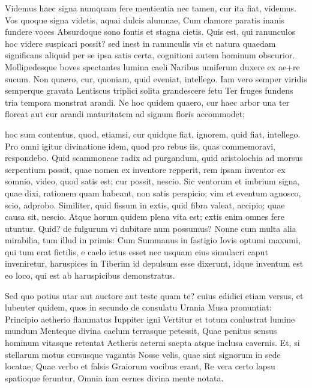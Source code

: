  Videmus haec signa numquam fere mentientia nec tamen, cur ita fiat, videmus. Vos quoque signa videtis, aquai dulcis alumnae, Cum clamore paratis inanis fundere voces Absurdoque sono fontis et stagna cietis. Quis est, qui ranunculos hoc videre suspicari possit? sed inest in ranunculis vis et natura quaedam significans aliquid per se ipsa satis certa, cognitioni autem hominum obscurior. Mollipedesque boves spectantes lumina caeli Naribus umiferum duxere ex ae+re sucum. Non quaero, cur, quoniam, quid eveniat, intellego. Iam vero semper viridis semperque gravata Lentiscus triplici solita grandescere fetu Ter fruges fundens tria tempora monstrat arandi. Ne hoc quidem quaero, cur haec arbor una ter floreat aut cur arandi maturitatem ad signum floris accommodet;

 hoc sum contentus, quod, etiamsi, cur quidque fiat, ignorem, quid fiat, intellego. Pro omni igitur divinatione idem, quod pro rebus iis, quas commemoravi, respondebo. Quid scammoneae radix ad purgandum, quid aristolochia ad morsus serpentium possit, quae nomen ex inventore repperit, rem ipsam inventor ex somnio, video, quod satis est; cur possit, nescio. Sic ventorum et imbrium signa, quae dixi, rationem quam habeant, non satis perspicio; vim et eventum agnosco, scio, adprobo. Similiter, quid fissum in extis, quid fibra valeat, accipio; quae causa sit, nescio. Atque horum quidem plena vita est; extis enim omnes fere utuntur. Quid? de fulgurum vi dubitare num possumus? Nonne cum multa alia mirabilia, tum illud in primis: Cum Summanus in fastigio Iovis optumi maxumi, qui tum erat fictilis, e caelo ictus esset nec usquam eius simulacri caput inveniretur, haruspices in Tiberim id depulsum esse dixerunt, idque inventum est eo loco, qui est ab haruspicibus demonstratus.

 Sed quo potius utar aut auctore aut teste quam te? cuius edidici etiam versus, et lubenter quidem, quos in secundo de consulatu Urania Musa pronuntiat: Principio aetherio flammatus Iuppiter igni Vertitur et totum conlustrat lumine mundum Menteque divina caelum terrasque petessit, Quae penitus sensus hominum vitasque retentat Aetheris aeterni saepta atque inclusa cavernis. Et, si stellarum motus cursusque vagantis Nosse velis, quae sint signorum in sede locatae, Quae verbo et falsis Graiorum vocibus erant, Re vera certo lapsu spatioque feruntur, Omnia iam cernes divina mente notata.

